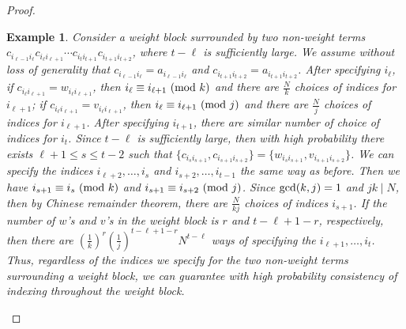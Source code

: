 \documentclass[11pt,reqno]{amsart}
\numberwithin{equation}{section}
\theoremstyle{plain}
\newtheorem{example}[thm]{Example}
\begin{document}
\begin{proof}
\begin{example}
Consider a weight block surrounded by two non-weight terms $c_{i_{\ell-1} i_{\ell}} c_{i_{\ell}i_{\ell+1}}\cdots c_{i_{t}i_{t+1}} c_{i_{t+1} i_{t+2}}$, where $t-\ell$ is sufficiently large. We assume without loss of generality that $c_{i_{\ell-1} i_{\ell}}=a_{i_{\ell-1} i_{\ell}}$ and $c_{i_{t+1} i_{t+2}}=a_{i_{t+1} i_{t+2}}$. After specifying $i_{\ell}$, if $c_{i_{\ell}i_{\ell+1}}=w_{i_{\ell}i_{\ell+1}}$, then $i_{\ell}\equiv i_{\ell+1}\textup{ (mod $k$)}$ and there are $\frac{N}{k}$ choices of indices for $i_{\ell+1}$; if $c_{i_{\ell}i_{\ell+1}}=v_{i_{\ell}i_{\ell+1}}$, then $i_{\ell}\equiv i_{\ell+1}\textup{ (mod $j$)}$ and there are $\frac{N}{j}$ choices of indices for $i_{\ell+1}$. After specifying $i_{t+1}$, there are similar number of choice of indices for $i_{t}$. Since $t-\ell$ is sufficiently large, then with high probability there exists $\ell+1\leq s\leq t-2$ such that $\{c_{i_s i_{s+1}}, c_{i_{s+1}i_{s+2}}\}=\{w_{i_s i_{s+1}}, v_{i_{s+1}i_{s+2}}\}$. We can specify the indices $i_{\ell+2}, \dots, i_s$ and $i_{s+2}, \dots, i_{t-1}$ the same way as before. Then we have $i_{s+1}\equiv i_s\textup{ (mod $k$)}$ and $i_{s+1}\equiv i_{s+2}\textup{ (mod $j$)}$. Since $\textup{gcd}(k, j)=1$ and $jk\mid N$, then by Chinese remainder theorem, there are $\frac{N}{kj}$ choices of indices $i_{s+1}$. If the number of $w$'s and $v$'s in the weight block is $r$ and $t-\ell+1-r$, respectively, then there are $\left(\frac{1}{k}\right)^{r}\left(\frac{1}{j}\right)^{t-\ell+1-r}N^{t-\ell}$ ways of specifying the $i_{\ell+1}, \dots, i_{t}$. Thus, regardless of the indices we specify for the two non-weight terms surrounding a weight block, we can guarantee with high probability consistency of indexing throughout the weight block.
\end{example}


\end{proof}
\end{document}
